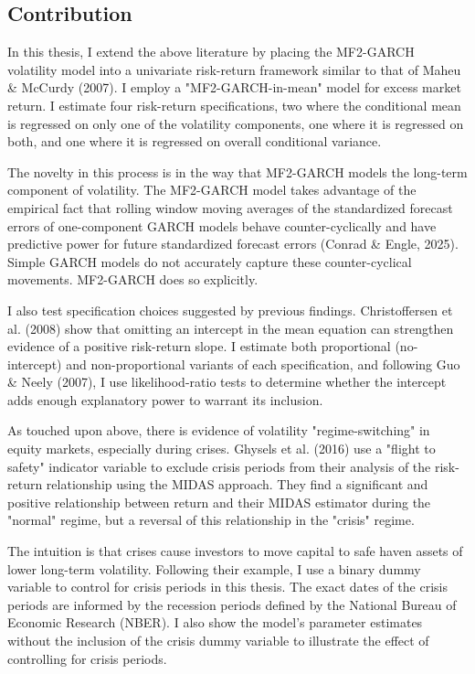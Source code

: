 \documentclass[12pt]{article}
\begin{document}
\subsection{Contribution}
In this thesis, I extend the above literature by placing the MF2-GARCH volatility model into a univariate risk-return framework similar to that of Maheu \& McCurdy (2007). I employ a "MF2-GARCH-in-mean" model for excess market return. I estimate four risk-return specifications, two where the conditional mean is regressed on only one of the volatility components, one where it is regressed on both, and one where it is regressed on overall conditional variance.\par
The novelty in this process is in the way that MF2-GARCH models the long-term component of volatility. The MF2-GARCH model takes advantage of the empirical fact that rolling window moving averages of the standardized forecast errors of one-component GARCH models behave counter-cyclically and have predictive power for future standardized forecast errors (Conrad \& Engle, 2025). Simple GARCH models do not accurately capture these counter-cyclical movements. MF2-GARCH does so explicitly.\par
I also test specification choices suggested by previous findings. Christoffersen et al. (2008) show that omitting an intercept in the mean equation can strengthen evidence of a positive risk-return slope. I estimate both proportional (no-intercept) and non-proportional variants of each specification, and following Guo \& Neely (2007), I use likelihood-ratio tests to determine whether the intercept adds enough explanatory power to warrant its inclusion.\par
As touched upon above, there is evidence of volatility "regime-switching" in equity markets, especially during crises. Ghysels et al. (2016) use a "flight to safety" indicator variable to exclude crisis periods from their analysis of the risk-return relationship using the MIDAS approach. They find a significant and positive relationship between return and their MIDAS estimator during the "normal" regime, but a reversal of this relationship in the "crisis" regime.\par
The intuition is that crises cause investors to move capital to safe haven assets of lower long-term volatility. Following their example, I use a binary dummy variable to control for crisis periods in this thesis. The exact dates of the crisis periods are informed by the recession periods defined by the National Bureau of Economic Research (NBER). I also show the model's parameter estimates without the inclusion of the crisis dummy variable to illustrate the effect of controlling for crisis periods.\par
\end{document}
